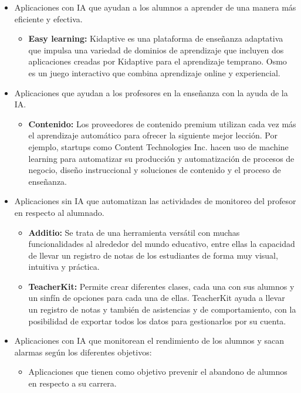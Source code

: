 \begin{itemize}
\item Aplicaciones con IA que ayudan a los alumnos a aprender de una manera más eficiente y efectiva.
\begin{itemize}
\item \textbf{Easy learning:} Kidaptive es una plataforma de enseñanza adaptativa que impulsa una variedad de dominios de aprendizaje que incluyen dos aplicaciones creadas por Kidaptive para el aprendizaje temprano. Osmo es un juego interactivo que combina aprendizaje online y experiencial.
\end{itemize}
\item Aplicaciones que ayudan a los profesores en la enseñanza con la ayuda de la IA.
\begin{itemize}
\item \textbf{Contenido:} Los proveedores de contenido premium utilizan cada vez más el aprendizaje automático para ofrecer la siguiente mejor lección. Por ejemplo, startups como Content Technologies Inc. hacen uso de machine learning para automatizar su producción y automatización de procesos de negocio, diseño instruccional y soluciones de contenido y el proceso de enseñanza. 
\end{itemize}
\item Aplicaciones sin IA que automatizan las actividades de monitoreo del profesor en respecto al alumnado.\cite{appsEvaluacionEstudiantes}
\begin{itemize}
\item \textbf{Additio:} Se trata de una herramienta versátil con muchas funcionalidades al alrededor del mundo educativo, entre ellas la capacidad de llevar un registro de notas de los estudiantes de forma muy visual, intuitiva y práctica.
\item \textbf{TeacherKit:} Permite crear diferentes clases, cada una con sus alumnos y un sinfín de opciones para cada una de ellas. TeacherKit ayuda a llevar un registro de notas y también de asistencias y de comportamiento, con la posibilidad de exportar todos los datos para gestionarlos por su cuenta.
\end{itemize}
\item Aplicaciones con IA que monitorean el rendimiento de los alumnos y sacan alarmas según los diferentes objetivos:
\begin{itemize}
\item Aplicaciones que tienen como objetivo prevenir el abandono de alumnos en respecto a su carrera.
\begin{itemize}

\end{itemize}
\end{itemize}
\end{itemize}
